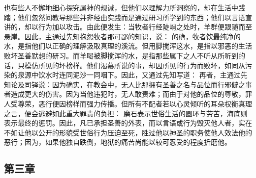 也有些人不懈地细心探究属神的规诫，但他们以理解力所洞察的，却在生活中践踏；他们忽然间教导那些并非经由实践而是通过研习所学到的东西；他们以言语宣讲的，却以行为加以攻击。由此便发生：当牧者行经陡峭之处时，羊群便跟随而至悬崖。因此，主通过先知抱怨牧者那可鄙的知识，说： 的确，牧者饮最纯净的水，是指他们以正确的理解汲取真理的溪流。但用脚搅浑这水，是指以邪恶的生活败坏圣善默想的研习。而羊喝被脚搅浑的水，是指那些属下之人不听从所听到的话，只模仿所见的坏榜样。他们渴慕所说的事，却因所见的行为而败坏，如同从污染的泉源中饮水时连同泥沙一同咽下。因此，又通过先知写道： 再者，主通过先知论及司铎说：因为确实，在教会中，无人比那拥有圣善之名与品位而行邪僻之事者造成更大的伤害。因为当他违犯时，无人敢责难；而由于对他的品位的尊敬，罪人受尊荣，恶行便因榜样而强力传播。但所有不配者若以心灵倾听的耳朵权衡真理之言，便会逃避如此重大罪责的负担： 磨石表示世俗生活的圆环与劳苦，海底则表示最终的惩罚。因此，凡已承担圣善的外表，而以言语或行为毁灭他人者，实在不如让他以公开的形貌受世俗行为压迫至死，胜过他以神圣的职务使他人效法他的恶行；因为，如果他独自跌倒，地狱的痛苦尚能以较可忍受的程度折磨他。\par


\subsection{第三章}

\par

